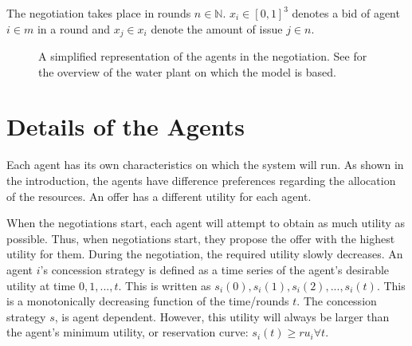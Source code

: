 The negotiation takes place in rounds $n\in \mathbb{N} $. ${x}_i \in [0,1]^3$ denotes a bid of agent $i \in m$ in a round and $x_{j}\in {x}_i$  denote the amount of issue $j \in n$. 



\begin{figure}
	\centering
	\caption{A simplified representation of the agents in the negotiation. See  for the overview of the water plant on which the model is based.}
	\label{fig:agent-plant}
\end{figure}

\section{Details of the Agents}
Each agent has its own characteristics on which the system will run. As shown in the introduction, the agents have difference preferences regarding the allocation of the resources. An offer has a different utility for each agent. 

When the negotiations start, each agent will attempt to obtain as much utility as possible. Thus, when negotiations start, they propose the offer with the highest utility for them. During the negotiation, the required utility slowly decreases. An agent $i$'s concession strategy is defined as a time series of the agent's desirable utility at time $0,1,...,t$. This is written as $s_i(0), s_i(1), s_i(2),..., s_i(t)$.  This is a monotonically decreasing function of the time/rounds $t$. The concession strategy $s$, is agent dependent. However, this utility will always be larger than the agent's minimum utility, or reservation curve: $s_i(t) \geq ru_i\forall t$.

